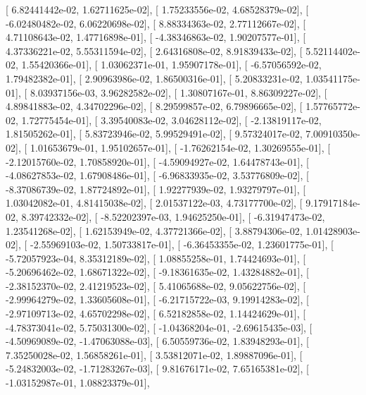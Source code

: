 \documentclass{article}
\begin{document}
       [  6.82441442e-02,   1.62711625e-02],
       [  1.75233556e-02,   4.68528379e-02],
       [ -6.02480482e-02,   6.06220698e-02],
       [  8.88334363e-02,   2.77112667e-02],
       [  4.71108643e-02,   1.47716898e-01],
       [ -4.38346863e-02,   1.90207577e-01],
       [  4.37336221e-02,   5.55311594e-02],
       [  2.64316808e-02,   8.91839433e-02],
       [  5.52114402e-02,   1.55420366e-01],
       [  1.03062371e-01,   1.95907178e-01],
       [ -6.57056592e-02,   1.79482382e-01],
       [  2.90963986e-02,   1.86500316e-01],
       [  5.20833231e-02,   1.03541175e-01],
       [  8.03937156e-03,   3.96282582e-02],
       [  1.30807167e-01,   8.86309227e-02],
       [  4.89841883e-02,   4.34702296e-02],
       [  8.29599857e-02,   6.79896665e-02],
       [  1.57765772e-02,   1.72775454e-01],
       [  3.39540083e-02,   3.04628112e-02],
       [ -2.13819117e-02,   1.81505262e-01],
       [  5.83723946e-02,   5.99529491e-02],
       [  9.57324017e-02,   7.00910350e-02],
       [  1.01653679e-01,   1.95102657e-01],
       [ -1.76262154e-02,   1.30269555e-01],
       [ -2.12015760e-02,   1.70858920e-01],
       [ -4.59094927e-02,   1.64478743e-01],
       [ -4.08627853e-02,   1.67908486e-01],
       [ -6.96833935e-02,   3.53776809e-02],
       [ -8.37086739e-02,   1.87724892e-01],
       [  1.92277939e-02,   1.93279797e-01],
       [  1.03042082e-01,   4.81415038e-02],
       [  2.01537122e-03,   4.73177700e-02],
       [  9.17917184e-02,   8.39742332e-02],
       [ -8.52202397e-03,   1.94625250e-01],
       [ -6.31947473e-02,   1.23541268e-02],
       [  1.62153949e-02,   4.37721366e-02],
       [  3.88794306e-02,   1.01428903e-02],
       [ -2.55969103e-02,   1.50733817e-01],
       [ -6.36453355e-02,   1.23601775e-01],
       [ -5.72057923e-04,   8.35312189e-02],
       [  1.08855258e-01,   1.74424693e-01],
       [ -5.20696462e-02,   1.68671322e-02],
       [ -9.18361635e-02,   1.43284882e-01],
       [ -2.38152370e-02,   2.41219523e-02],
       [  5.41065688e-02,   9.05622756e-02],
       [ -2.99964279e-02,   1.33605608e-01],
       [ -6.21715722e-03,   9.19914283e-02],
       [ -2.97109713e-02,   4.65702298e-02],
       [  6.52182858e-02,   1.14424629e-01],
       [ -4.78373041e-02,   5.75031300e-02],
       [ -1.04368204e-01,  -2.69615435e-03],
       [ -4.50969089e-02,  -1.47063088e-03],
       [  6.50559736e-02,   1.83948293e-01],
       [  7.35250028e-02,   1.56858261e-01],
       [  3.53812071e-02,   1.89887096e-01],
       [ -5.24832003e-02,  -1.71283267e-03],
       [  9.81676171e-02,   7.65165381e-02],
       [ -1.03152987e-01,   1.08823379e-01],
\end{document}
